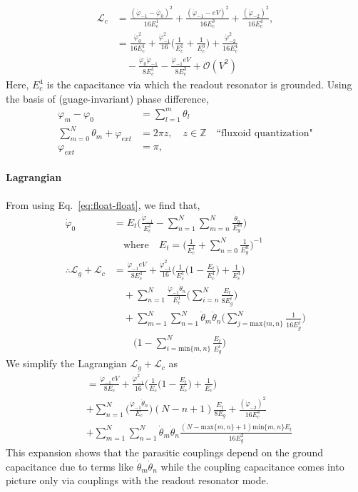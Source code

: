 \documentclass[prx,showpacs,notitlepage,twocolumn,superscriptaddress,nofootinbib,preprintnumbers,floatfix]{revtex4-2}
\begin{document}
\begin{align}
\mathcal{L}_{c}&=\frac{(\dot{\varphi}_{-1}-\dot{\varphi_0})^2}{16E^1_{c}}+\frac{(\dot{\varphi}_{-1}-eV)^2}{16E^3_{c}}+\frac{(\dot{\varphi}_{-2})^2}{16E^4_{c}},\\ &=\frac{\dot{\varphi}^2_0}{16E^1_c}+\frac{\dot{\varphi}^2_{-1}}{16}\Big(\frac{1}{E^1_c}+\frac{1}{E^3_c}\Big)+\frac{\dot{\varphi}^2_{-2}}{16E^4_c}\nonumber\\&\quad-\frac{\dot{\varphi}_0\dot{\varphi}_{-1}}{8E^1_c}-\frac{\dot{\varphi}_{-1}eV}{8E^3_c}+\mathcal{O}(V^2)
\end{align}
Here, $E_c^4$ is the capacitance via which the readout resonator is grounded. Using the basis of (guage-invariant) phase difference, 
\begin{align}
\varphi_m-\varphi_0&=\sum_{l=1}^m\theta_l\\ \sum_{m=0}^N \theta_m+\varphi_{ext}&=2\pi z, \quad z\in\mathbb{Z}\quad\text{``fluxoid quantization"}\\
\varphi_{ext}&=\pi,    
\end{align}
\paragraph{Lagrangian} 
From using Eq.~\ref{eq:float-float}, we find that, 
\begin{align}
    \dot{\varphi}_0&=E_t\Big(\frac{\dot{\varphi}_{-1}}{E_c^1}-\sum_{n=1}^N\sum_{m=n}^N\frac{\dot{\theta}_n}{E^m_g}\Big)\\&\quad\text{where}\quad E_t=\Big(\frac{1}{E_c^1}+\sum_{n=0}^N\frac{1}{E^n_g}\Big)^{-1}\nonumber\\
\therefore     \mathcal{L}_g+\mathcal{L}_c&=\frac{\dot{\varphi}_{-1}eV}{8E^3_c}+\frac{\dot{\varphi}^2_{-1}}{16}\Big(\frac{1}{E^1_c}\Big(1-\frac{E_t}{E_c^1}\Big)+\frac{1}{E^3_c}\Big)\nonumber\\&\quad+\sum_{n=1}^N\frac{\dot{\varphi}_{-1}\dot{\theta}_n}{E_c^1}\Big(\sum_{i=n}^N\frac{E_t}{8E^i_g}\Big)\nonumber\\&\quad+\sum_{m=1}^N\sum_{n=1}^N\dot{\theta}_m\dot{\theta}_{n}\Big( \sum_{j=\text{max}\{m,n\}}^N\frac{1}{16E_g^j}\Big)\nonumber\\&\quad\quad\Big(1-\sum_{i=\text{min}\{m,n\}}^N\frac{E_t}{E_g^i}\Big)
\end{align}
We simplify the Lagrangian $\mathcal{L}_g+\mathcal{L}_c$ as
\begin{align}
    &=\frac{\dot{\varphi}_{-1}eV}{8E_c}+\frac{\dot{\varphi}^2_{-1}}{16}\Big(\frac{1}{E_c}\Big(1-\frac{E_t}{E_c}\Big)+\frac{1}{E_c}\Big)\nonumber\\&+\sum_{n=1}^N\Big(\frac{\dot{\varphi}_{-1}\dot{\theta}_n}{E_c}\Big)(N-n+1)\frac{E_t}{8E_g}+\frac{(\dot{\varphi}_{-2})^2}{16E^4_{c}}\nonumber\\
&+\sum_{m=1}^N\sum_{n=1}^N\dot{\theta}_m\dot{\theta}_{n} \frac{(N-\text{max}\{m,n\}+1)\text{min}\{m,n\}E_t}{16E_g^2}
\end{align}
This expansion shows that the parasitic couplings depend on the ground capacitance due to terms like $\dot{\theta}_m\dot{\theta}_n$ while the coupling capacitance comes into picture only via couplings with the readout resonator mode. 
\end{document}
